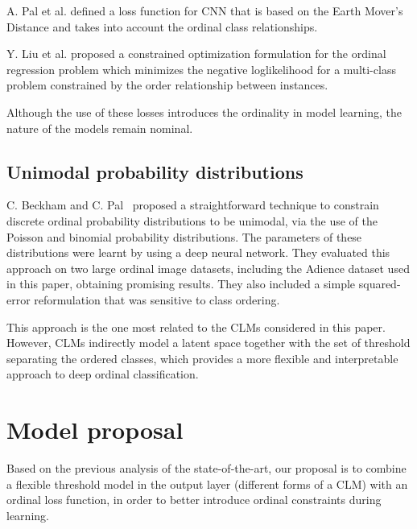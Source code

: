 \documentclass[journal]{IEEEtran}
\begin{document}
	A. Pal et al. \cite{pal2018severity} defined a loss function for CNN that is based on the Earth Mover's Distance and takes into account the ordinal class relationships.
	
	Y. Liu et al. \cite{liu2018constrained} proposed a constrained optimization formulation for the ordinal regression problem which minimizes the negative loglikelihood for a multi-class problem constrained by the order relationship between instances.	
	
	Although the use of these losses introduces the ordinality in model learning, the nature of the models remain nominal.
	
	
	\subsection{Unimodal probability distributions}

	C. Beckham and C. Pal~\cite{beckham2017unimodal} proposed a straightforward technique to constrain discrete ordinal probability distributions to be unimodal, via the use of the Poisson and binomial probability distributions. The parameters of these distributions were learnt by using a deep neural network. They evaluated this approach on two large ordinal image datasets, including the Adience dataset used in this paper, obtaining promising results. They also included a simple squared-error reformulation \cite{beckham2016simple} that was sensitive to class ordering.
	
	This approach is the one most related to the CLMs considered in this paper. However, CLMs indirectly model a latent space together with the set of threshold separating the ordered classes, which provides a more flexible and interpretable approach to deep ordinal classification.	
	
	\section{Model proposal}
	\label{sect:modelProposal}
	
	Based on the previous analysis of the state-of-the-art, our proposal is to combine a flexible threshold model in the output layer (different forms of a CLM) with an ordinal loss function, in order to better introduce ordinal constraints during learning.
	
\end{document}

